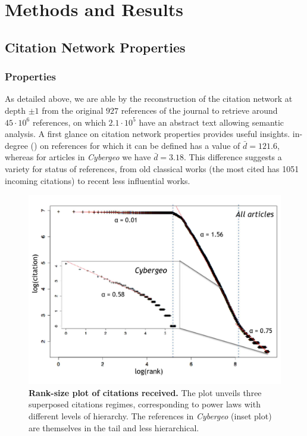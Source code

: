 \section*{Methods and Results}
\label{sec:results}



\subsection*{Citation Network Properties}

\subsubsection*{Properties}


As detailed above, we are able by the reconstruction of the citation network at depth $\pm 1$ from the original $927$ references of the journal to retrieve around $45\cdot 10^6$ references, on which $2.1\cdot 10^5$ have an abstract text allowing semantic analysis. A first glance on citation network properties provides useful insights.  in-degree () on references for which it can be defined has a value of $\bar{d}=121.6$, whereas for articles in \textit{Cybergeo} we have $\bar{d}=3.18$. This difference suggests a variety for status of references, from old classical works (the most cited has 1051 incoming citations) to recent less influential works.


\begin{figure}
\centering
\includegraphics[width=\textwidth]{figures/Fig3.jpg}
\caption{\textbf{Rank-size plot of citations received.} The plot unveils three superposed citations regimes, corresponding to power laws with different levels of hierarchy. The references in \textit{Cybergeo} (inset plot) are themselves in the tail and less hierarchical.}
\label{fig:ranksize}
\end{figure}


